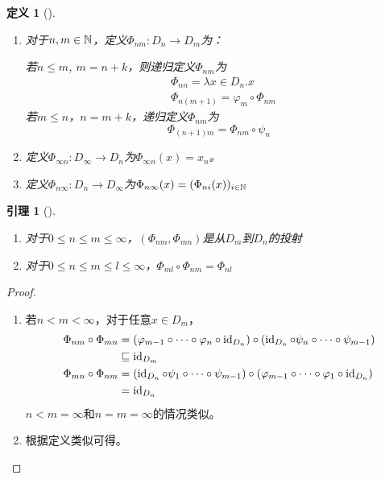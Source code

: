 \documentclass{jams-l}
\newtheorem{lemma}[theorem]{引理}
\newtheorem{definition}[theorem]{定义}
\begin{document}
\begin{definition}[]
\begin{enumerate}
\item 对于\(n,m\in\mathbb{N}\)，定义\(\Phi_{nm}:D_n\to D_m\)为：

若\(n\le m\), \(m=n+k\)，则递归定义\(\Phi_{nm}\)为
\begin{align*}
&\Phi_{nn}=\lambda x\in D_n.x\\
&\Phi_{n(m+1)}=\varphi_m\circ\Phi_{nm}
\end{align*}
若\(m\le n\)，\(n=m+k\)，递归定义\(\Phi_{nm}\)为
\begin{equation*}
\Phi_{(n+1)m}=\Phi_{nm}\circ\psi_n
\end{equation*}
\item 定义\(\Phi_{\infty n}:D_\infty\to D_n\)为\(\Phi_{\infty n}(x)=x_n\)。
\item 定义\(\Phi_{n\infty}:D_n\to D_\infty\)为\(\Phi_{n\infty}(x)=(\Phi_{ni}(x))_{i\in\mathbb{N}}\)
\end{enumerate}
\end{definition}

\begin{lemma}[]
\begin{enumerate}
\item 对于\(0\le n\le m\le\infty\)，\((\Phi_{nm},\Phi_{mn})\)是从\(D_m\)到\(D_n\)的投射
\item 对于\(0\le n\le m\le l\le\infty\)，\(\Phi_{ml}\circ\Phi_{nm}=\Phi_{nl}\)
\end{enumerate}
\end{lemma}

\begin{proof}
\begin{enumerate}
\item 若\(n<m<\infty\)，对于任意\(x\in D_m\)，
\begin{align*}
\Phi_{nm}\circ\Phi_{mn}&=(\varphi_{m-1}\circ\dots\circ\varphi_n\circ\operatorname{id}_{D_n})\circ(\operatorname{id}_{D_n}\circ\psi_n\circ\dots\circ\psi_{m-1})\\
&\sqsubseteq\operatorname{id}_{D_m}\\
\Phi_{mn}\circ\Phi_{nm}&=(\operatorname{id}_{D_n}\circ\psi_1\circ\dots\circ\psi_{m-1})\circ(\varphi_{m-1}\circ\dots\circ\varphi_1\circ\operatorname{id}_{D_n})\\
&=\operatorname{id}_{D_n}
\end{align*}
\(n<m=\infty\)和\(n=m=\infty\)的情况类似。
\item 根据定义类似可得。
\end{enumerate}
\end{proof}
\end{document}
